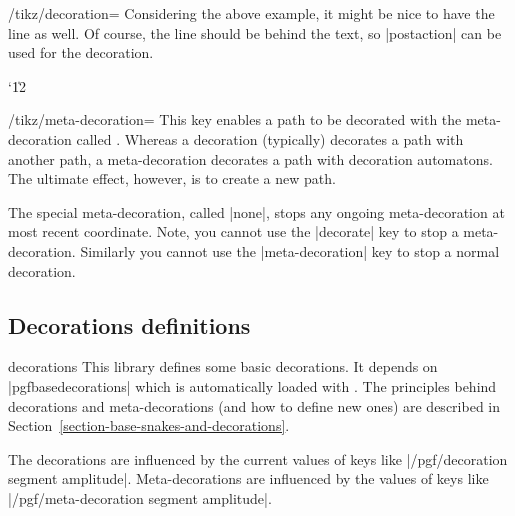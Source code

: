 \begin{key}{/tikz/decoration=}
  Considering the above example, it might be nice to have the line as
  well. Of course, the line should be behind the text, so |postaction|
  can be used for the decoration.
  
\begin{codeexample}[]
\catcode`\|12
\end{codeexample} 
\end{key}

\begin{key}{/tikz/meta-decoration=}
	This key enables a path to be decorated with the meta-decoration
	called . Whereas a decoration (typically) decorates a path
	with another path, a meta-decoration decorates a path with
	decoration automatons. The ultimate effect, however, is to create	a
	new path. 


\begin{codeexample}[]
\end{codeexample}

	The special meta-decoration, called |none|, stops any ongoing 
	meta-decoration	at most recent coordinate. Note, you cannot use
	the |decorate| key to stop a meta-decoration. Similarly you
	cannot use the |meta-decoration| key to stop a normal decoration.

	
\end{key}



\subsection{Decorations definitions}



\begin{pgflibrary}{decorations}
	This library defines some basic decorations. It depends on
	|pgfbasedecorations| which is automatically loaded with \pgfname.
	The principles behind decorations and meta-decorations (and how to
	define new ones) are described in 
	Section~\ref{section-base-snakes-and-decorations}.
	
	The decorations are influenced by the current values of keys like
  |/pgf/decoration segment amplitude|. Meta-decorations are influenced
  by the values of keys like |/pgf/meta-decoration segment amplitude|.
\end{pgflibrary}



